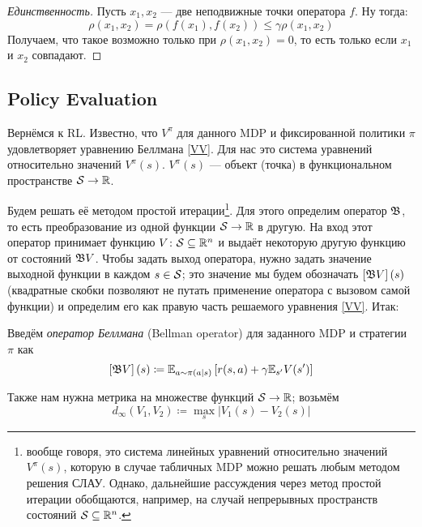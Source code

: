 \begin{theorem}
\begin{proof}[Единственность] Пусть $x_1, x_2$ --- две неподвижные точки оператора $f$. Ну тогда:
$$\rho(x_1, x_2) = \rho(f(x_1), f(x_2)) \le \gamma \rho(x_1, x_2)$$
Получаем, что такое возможно только при $\rho(x_1, x_2) = 0$, то есть только если $x_1$ и $x_2$ совпадают.
\end{proof}
\end{theorem}


\subsection{Policy Evaluation}

Вернёмся к RL. Известно, что $V^\pi$ для данного MDP и фиксированной политики $\pi$ удовлетворяет уравнению Беллмана \eqref{VV}. Для нас это система уравнений относительно значений $V^\pi(s)$. $V^\pi(s)$ --- объект (точка) в функциональном пространстве $\mathcal{S} \to \mathbb{R}$.

Будем решать её методом простой итерации\footnote{вообще говоря, это система линейных уравнений относительно значений $V^\pi(s)$, которую в случае табличных MDP можно решать любым методом решения СЛАУ. Однако, дальнейшие рассуждения через метод простой итерации обобщаются, например, на случай непрерывных пространств состояний $\St \HM\subseteq \R^n$.}. Для этого определим оператор $\mathfrak{B}$, то есть преобразование из одной функции $\St \HM\to \R$ в другую. На вход этот оператор принимает функцию $V \colon \St \HM\subseteq \R^n$ и выдаёт некоторую другую функцию от состояний $\mathfrak{B} V$. Чтобы задать выход оператора, нужно задать значение выходной функции в каждом $s \HM\in \St$; это значение мы будем обозначать $\left[\mathfrak{B} V\right] (s)$ (квадратные скобки позволяют не путать применение оператора с вызовом самой функции) и определим его как правую часть решаемого уравнения \eqref{VV}. Итак:

\begin{definition}
Введём \emph{оператор Беллмана} (Bellman operator) для заданного MDP и стратегии $\pi$ как
\begin{equation}\label{bellmanoperatorV}
\left[\mathfrak{B} V\right] (s) \coloneqq \mathbb{E}_{a \sim \pi(a \mid s)} \left[ r(s, a) + \gamma \mathbb{E}_{s'} V(s') \right]
\end{equation}
\end{definition}

Также нам нужна метрика на множестве функций $\mathcal{S} \to \mathbb{R}$; возьмём
$$d_\infty(V_1, V_2) \coloneqq \max_s | V_1(s) - V_2(s) |$$

